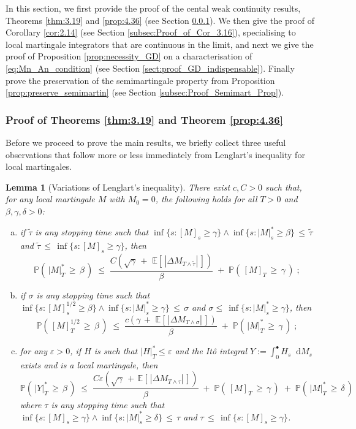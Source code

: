 \documentclass[11pt]{article}
\newtheorem{lem}[theorem]{Lemma}
\theoremstyle{definition}\newtheorem{example}[theorem]{Example}
\theoremstyle{definition}\newtheorem{counterexample}[theorem]{Counterexample}
\theoremstyle{definition}\newtheorem{remark}[theorem]{Remark}
\theoremstyle{definition}\newtheorem{defi}[theorem]{Definition}
\numberwithin{equation}{section}
\newcommand*\diff{\mathop{}\!\mathrm{d}}								%
\newcommand{\E}{\mathbb{E}}											%
\newcommand{\Pro}{\mathbb{P}}										%
\renewcommand{\|}{\; : \, \;}											%
\begin{document}
In this section, we first provide the proof of the cental weak continuity results, Theorems \ref{thm:3.19} and \ref{prop:4.36} (see Section \ref{sect:proof_main_weak_cont}). We then give the proof of Corollary \ref{cor:2.14} (see Section \ref{subsec:Proof_of_Cor_3.16}), specialising to local martingale integrators that are continuous in the limit, and next we give the proof of Proposition \ref{prop:necessity_GD} on a characterisation of \eqref{eq:Mn_An_condition} (see Section \ref{sect:proof_GD_indispensable}). Finally prove the preservation of the semimartingale property from Proposition \ref{prop:preserve_semimartin} (see Section \ref{subsec:Proof_Semimart_Prop}).

\subsubsection{Proof of Theorems \ref{thm:3.19} and Theorem \ref{prop:4.36}}\label{sect:proof_main_weak_cont}
Before we proceed to prove the main results, we briefly collect three useful observations that follow more or less immediately from Lenglart's inequality for local martingales.
\begin{lem}[Variations of Lenglart's inequality] \label{prop:Lenglart}
	There exist $c,C>0$ such that, for any local martingale $M$ with $M_0 =0$, the following holds for all $T>0$ and $\beta,\gamma,\delta>0$:
	\begin{enumerate}[(a)]
		\item if $\tilde \tau$ is any stopping time such that $\operatorname{inf}\{s: [M]_s\ge \gamma\} \wedge \operatorname{inf}\{s: |M|^*_s\ge \beta \} \, \le \, \tilde \tau $ and $\tilde \tau\, \le \, \operatorname{inf}\{s: [M]_s\ge \gamma\}$, then
		$$\Pro(\, |M|^*_T \, \ge \, \beta\, ) \; \le \; \frac{C(\sqrt{\gamma} \, +\,   \, \E[\, |\Delta M_{T\wedge \tilde \tau}|\, ])}{\beta} \; + \; \Pro(\, [M]_T \, \ge \, \gamma\, )\; ;$$
		\item if $\sigma$ is any stopping time such that $ \operatorname{inf}\{s: [M]^{1/2}_s\ge \beta \} \wedge \operatorname{inf}\{s: |M|^*_s\ge \gamma \}\, \le \, \sigma$ and $ \sigma \le \, \operatorname{inf}\{s: |M|^*_s\ge \gamma \}$, then
		$$\Pro(\, [M]^{1/2}_T \, \ge \, \beta\, ) \; \le \; \frac{c(\gamma \, +\,  \, \E[\, |\Delta M_{T\wedge \sigma}|\, ])}{\beta} \; + \; \Pro(\, |M|^*_T \, \ge \, \gamma\, )\; ;$$
		\item for any $\varepsilon>0$, if $H$ is such that $|H|_T^* \le \varepsilon$ and the Itô integral $Y:=\int_0^\bullet H_{s} \diff M_s$ exists and is a local martingale, then
		$$\Pro(\, |Y|^*_T \, \ge \, \beta\, ) \; \le \; \frac{C \varepsilon ( \sqrt{\gamma} \, +\, \E[\, |\Delta M_{T\wedge \tau}|\, ])}{\beta} \; + \; \Pro(\, [M]_T \, \ge \, \gamma \, ) \; + \; \Pro(\, |M|^*_T \, \ge \, \delta\, )$$
		where $\tau$ is any stopping time such that $\operatorname{inf}\{s: [M]_s\ge \gamma\} \wedge \operatorname{inf}\{s: |M|^*_s\ge \delta\} \, \le \, \tau$ and $\tau \, \le \, \operatorname{inf}\{s: [M]_s\ge \gamma\}$.
	\end{enumerate}
\end{lem}
\end{document}
